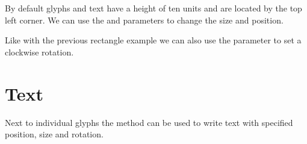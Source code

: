 \documentclass[a4paper,10pt,english,openany,oneside]{sphinxmanual}
\begin{document}
\noindent{}

\sphinxAtStartPar
By default glyphs and text have a height of ten units and are located by the top left corner. We can use the  and  parameters to change the size and position.

\begin{sphinxVerbatim}[commandchars=\\\{\}]
        
  
\end{sphinxVerbatim}

\noindent{}

\sphinxAtStartPar
Like with the previous rectangle example we can also use the  parameter to set a clockwise rotation.

\begin{sphinxVerbatim}[commandchars=\\\{\}]
     
  
\end{sphinxVerbatim}

\noindent{}


\section{Text}
\label{\detokenize{pages/quickstart:text}}
\sphinxAtStartPar
Next to individual glyphs the  method can be used to write text with specified position, size and rotation.
\end{document}
